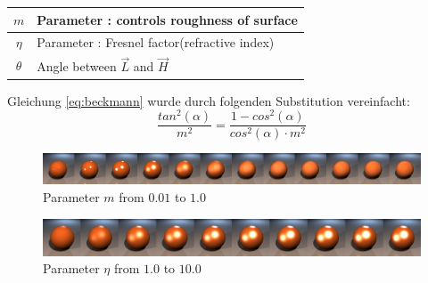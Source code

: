 \documentclass[11pt]{beamer}
\begin{document}
\begin{frame}[allowframebreaks]
\framebreak
\begin{table}[H]
\begin{tabular}{| c | l |}
\hline
$m$ & Parameter : controls roughness of surface\\ \hline
$\eta$  & Parameter : Fresnel factor(refractive index)\\ \hline
$\theta$  & Angle between $\vec{L}$ and $\vec{H}$\\ \hline
\end{tabular}
\end{table}
Gleichung \ref{eq:beckmann} wurde durch folgenden Substitution vereinfacht:
\begin{equation}
\frac{tan^2(\alpha)}{m^2} = \frac{1- cos^2(\alpha)}{cos^2(\alpha) \cdot m^2}
\end{equation}

\framebreak
\begin{figure}[H]
\includegraphics[width=\textwidth]{../ctroughcomplete.png}
\caption{Parameter $m$ from $0.01$ to $1.0$}
\end{figure}

\begin{figure}[H]
\includegraphics[width=\textwidth]{../ctfresnelcomplete.png}
\caption{Parameter $\eta$ from $1.0$ to $10.0$}
\end{figure}

\end{frame}
\end{document}

